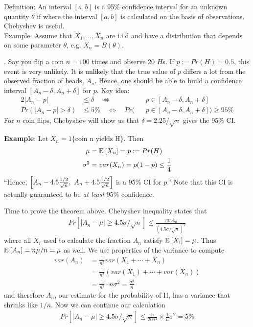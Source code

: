 \documentclass[12pt]{article}
\newcommand{\myspace}{\vspace{2\bigskipamount}}
\newcommand\p{\Needspace{12\baselineskip} \noindent}
\begin{document}
\p Definition: An interval $[a, b]$ is a 95\% confidence interval for an unknown quantity $\theta$ if
where the interval $[a, b]$ is calculated on the basis of observations. Chebyshev is useful. \\

Example: Assume that $X_1, \ldots, X_n$ are i.i.d and have a distribution that depends on some parameter $\theta$, e.g. $X_n = B(\theta)$. 

\myspace
\p {}. Say you flip a coin $n = 100$ times and observe 20 $H$s. If $p := Pr(H) = 0.5$, this event is very unlikely. It is unlikely that the true value of $p$ differs a lot from the observed fraction of heads, $A_n$. Hence, one should be able to build a confidence interval $[A_n - \delta, A_n + \delta]$ for $p$. Key idea:
\begin{alignat}{2}
| A_n - p| &\le \delta \quad \iff \quad &&p \in [A_n - \delta, A_n + \delta]  \\
Pr(| A_n - p| > \delta) &\le 5\% \quad \iff \quad Pr(&&p \in [A_n - \delta, A_n + \delta] ) \ge 95\%
\end{alignat}
For $n$ coin flips, Chebyshev will show us that $\delta = 2.25/\sqrt{n}$ gives the 95\% CI. 

\myspace
\p \Theorem[Let $X_n$ be i.i.d. with mean $\mu$ and variance $\sigma^2$. Define $A_n = \tfrac{X_1 + \cdots + X_n}{n}$. Then]
\textbf{Example}: Let $X_n = 1\{ \text{coin n yields H} \}$. Then 
\begin{align}
	\mu &= \mathbb{E}_{}\left[X_n\right] = p := Pr(H) \\
	\sigma^2 &= var(X_n) = p(1 - p) \le \frac{1}{4} 
\end{align}
``Hence, $\left[A_n - 4.5\frac{1/2}{\sqrt{n}},~ A_n + 4.5\frac{1/2}{\sqrt{n}}\right]$ is a 95\% CI for $p$.'' Note that this CI is actually guaranteed to be \textit{at least} 95\% confidence. 

\myspace
\p {} Time to prove the theorem above. Chebyshev inequality states that
\begin{align}
Pr\left[ |A_n - \mu| \ge 4.5\sigma/\sqrt{n}\right] \le \frac{var{A_n}}{(4.5\sigma/\sqrt{n})^2}
\end{align}
where all $X_i$ used to calculate the fraction $A_n$ satisfy $\mathbb{E}_{}\left[X_i\right] = \mu$. Thus $\mathbb{E}_{}\left[A_n\right] = n\mu/n = \mu$ as well. We use properties of the variance to compute
\begin{align}
var(A_n) &= \frac{1}{n^2} var(X_1 + \cdots + X_n) \\
&= \frac{1}{n^2} \left(var(X_1) + \cdots + var(X_n) \right) \\
&= \frac{1}{n^2} \cdot n\sigma^2 = \frac{\sigma^2}{n}
\end{align}
and therefore $A_n$, our estimate for the probability of H, has a variance that shrinks like $1/n$. Now we can continue our calculation
\begin{align}
Pr\left[ |A_n - \mu| \ge 4.5\sigma/\sqrt{n}\right] \le \frac{n}{20\sigma^2} \times \frac{1}{n} \sigma^2 = 5\%
\end{align}
\end{document}

